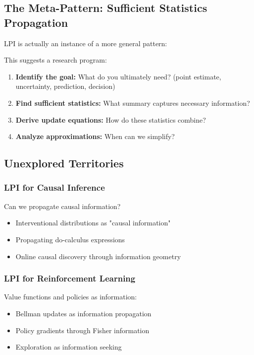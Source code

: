\documentclass[11pt]{article}
\begin{document}
\subsection{The Meta-Pattern: Sufficient Statistics Propagation}

LPI is actually an instance of a more general pattern:

\begin{center}
\end{center}

This suggests a research program:
\begin{enumerate}
\item \textbf{Identify the goal:} What do you ultimately need? (point estimate, uncertainty, prediction, decision)
\item \textbf{Find sufficient statistics:} What summary captures necessary information?
\item \textbf{Derive update equations:} How do these statistics combine?
\item \textbf{Analyze approximations:} When can we simplify?
\end{enumerate}

\subsection{Unexplored Territories}

\subsubsection{LPI for Causal Inference}
Can we propagate causal information?
\begin{itemize}
\item Interventional distributions as "causal information"
\item Propagating do-calculus expressions
\item Online causal discovery through information geometry
\end{itemize}

\subsubsection{LPI for Reinforcement Learning}
Value functions and policies as information:
\begin{itemize}
\item Bellman updates as information propagation
\item Policy gradients through Fisher information
\item Exploration as information seeking
\end{itemize}
\end{document}
